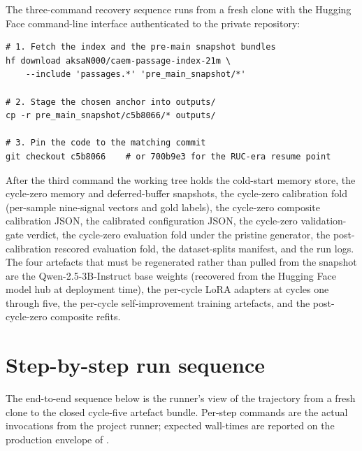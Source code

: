 The three-command recovery sequence runs from a fresh clone with the Hugging Face command-line interface authenticated to the private repository:
\begin{verbatim}
# 1. Fetch the index and the pre-main snapshot bundles
hf download aksaN000/caem-passage-index-21m \
    --include 'passages.*' 'pre_main_snapshot/*'

# 2. Stage the chosen anchor into outputs/
cp -r pre_main_snapshot/c5b8066/* outputs/

# 3. Pin the code to the matching commit
git checkout c5b8066    # or 700b9e3 for the RUC-era resume point
\end{verbatim}
After the third command the working tree holds the cold-start memory store, the cycle-zero memory and deferred-buffer snapshots, the cycle-zero calibration fold (per-sample nine-signal vectors and gold labels), the cycle-zero composite calibration JSON, the calibrated configuration JSON, the cycle-zero validation-gate verdict, the cycle-zero evaluation fold under the pristine generator, the post-calibration rescored evaluation fold, the dataset-splits manifest, and the run logs. The four artefacts that must be regenerated rather than pulled from the snapshot are the Qwen-2.5-3B-Instruct base weights (recovered from the Hugging Face model hub at deployment time), the per-cycle LoRA adapters at cycles one through five, the per-cycle self-improvement training artefacts, and the post-cycle-zero composite refits.

\section{Step-by-step run sequence}
\label{app:repro-steps}

The end-to-end sequence below is the runner's view of the trajectory from a fresh clone to the closed cycle-five artefact bundle. Per-step commands are the actual invocations from the project runner; expected wall-times are reported on the production envelope of .

